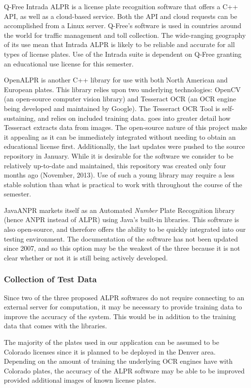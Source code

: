 \documentclass[11pt, oneside, fullpage, doublespace]{article}
\begin{document}
Q-Free Intrada ALPR is a license plate recognition software that offers a C++ API, as well as a cloud-based service. Both the API and cloud requests can be accomplished from a Linux server. Q-Free's software is used in countries around the world for traffic management and toll collection. The wide-ranging geography of its use mean that Intrada ALPR is likely to be reliable and accurate for all types of license plates. Use of the Intrada suite is dependent on Q-Free granting an educational use license for this semester.

OpenALPR is another C++ library for use with both North American and European plates. This library relies upon two underlying technologies: OpenCV (an open-source computer vision library) and Tesseract OCR (an OCR engine being developed and maintained by Google). The Tesseract OCR Tool is self-sustaining, and relies on included training data. \cite{patel2012} goes into greater detail how Tesseract extracts data from images. The open-source nature of this project make it appealing as it can be immediately integrated without needing to obtain an educational license first. Additionally, the last updates were pushed to the source repository in January. While it is desirable for the software we consider to be relatively up-to-date and maintained, this repository was created only four months ago (November, 2013). Use of such a young library may require a less stable solution than what is practical to work with throughout the course of the semester.

JavaANPR markets itself as an Automated \emph{Number} Plate Recognition library (hence ANPR instead of ALPR) using Java's built-in libraries. This software is also open-source, and therefore offers the ability to be quickly integrated into our testing environment. The documentation of the software has not been updated since 2007, and so this option may be the weakest of the three because it is not clear whether or not it is still being actively developed.

\subsubsection{Collection of Test Data}
Since two of the three proposed ALPR softwares do not require connecting to an external server for computation, it may be necessary to provide training data to improve the accuracy of the system. This would be in addition to the training data that comes with the libraries.

The majority of the plates used in our application can be assumed to be Colorado licenses since it is planned to be deployed in the Denver area. Depending on the amount of training the underlying OCR engines have with Colorado plates, the accuracy of the ALPR software may be able to be improved provided additional images of known license plates.
\end{document}
